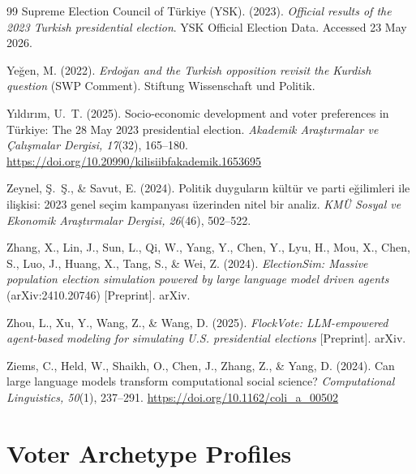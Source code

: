 \documentclass[12pt,a4paper]{report}
\begin{document}
\begin{thebibliography}{99}
Supreme Election Council of Türkiye (YSK). (2023). \emph{Official results of the 2023 Turkish presidential election}. YSK Official Election Data. Accessed 23 May 2026.

Yeğen, M. (2022). \emph{Erdoğan and the Turkish opposition revisit the Kurdish question} (SWP Comment). Stiftung Wissenschaft und Politik.

Yıldırım, U.~T. (2025). Socio-economic development and voter preferences in Türkiye: The 28 May 2023 presidential election. \emph{Akademik Araştırmalar ve Çalışmalar Dergisi, 17}(32), 165--180. \url{https://doi.org/10.20990/kilisiibfakademik.1653695}

Zeynel, Ş.~Ş., \& Savut, E. (2024). Politik duyguların kültür ve parti eğilimleri ile ilişkisi: 2023 genel seçim kampanyası üzerinden nitel bir analiz. \emph{KMÜ Sosyal ve Ekonomik Araştırmalar Dergisi, 26}(46), 502--522.

Zhang, X., Lin, J., Sun, L., Qi, W., Yang, Y., Chen, Y., Lyu, H., Mou, X., Chen, S., Luo, J., Huang, X., Tang, S., \& Wei, Z. (2024). \emph{ElectionSim: Massive population election simulation powered by large language model driven agents} (arXiv:2410.20746) [Preprint]. arXiv.

Zhou, L., Xu, Y., Wang, Z., \& Wang, D. (2025). \emph{FlockVote: LLM-empowered agent-based modeling for simulating U.S. presidential elections} [Preprint]. arXiv.

Ziems, C., Held, W., Shaikh, O., Chen, J., Zhang, Z., \& Yang, D. (2024). Can large language models transform computational social science? \emph{Computational Linguistics, 50}(1), 237--291. \url{https://doi.org/10.1162/coli_a_00502}

\end{thebibliography}

\appendix
\renewcommand{\thechapter}{\Alph{chapter}}

\chapter{Voter Archetype Profiles}
\label{app:archetype_profiles}
\end{document}
